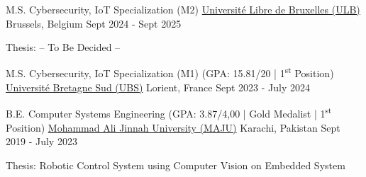 

\begin{cventries}

  \cventry
    {M.S. Cybersecurity, IoT Specialization (M2)} %
    {\href{https://www.ulb.be/en/programme/m-secum}{Université Libre de Bruxelles (ULB)}} %
    {Brussels, Belgium} %
    {Sept 2024 - Sept 2025} %
    {
      \begin{cvitems} %
        \item[] {Thesis: -- To Be Decided --}
      \end{cvitems}
    }
    

\cventryshort
    {M.S. Cybersecurity, IoT Specialization  (M1) (GPA: 15.81/20 | 1\textsuperscript{st} Position)} %
    {\href{https://www.univ-ubs.fr/}{Université Bretagne Sud (UBS)}} %
    {Lorient, France} %
    {Sept 2023 - July 2024} %
    
\cventryshort
    {B.E. Computer Systems Engineering (GPA: 3.87/4,00 | Gold Medalist | 1\textsuperscript{st} Position)} %
    {\href{https://jinnah.edu/}{Mohammad Ali Jinnah University (MAJU)}} %
    {Karachi, Pakistan} %
    {Sept 2019 - July 2023} %
    {
      \begin{cvitems} %
        \item[] {Thesis: Robotic Control System using Computer Vision on Embedded System}
      \end{cvitems}
    }
\end{cventries}

